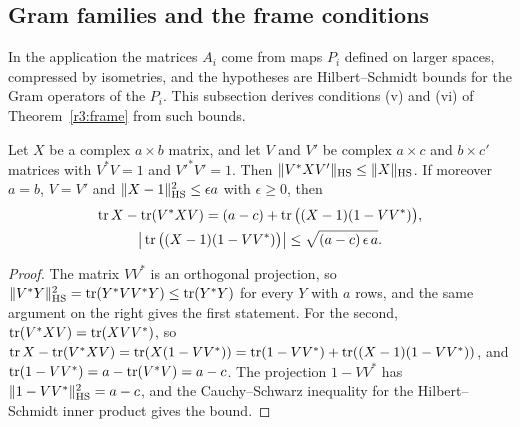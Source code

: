 \subsection{Gram families and the frame conditions}\label{r3:sec:gram}

In the application the matrices $A_i$ come from maps $P_i$ defined on larger spaces, compressed by isometries, and the hypotheses are Hilbert--Schmidt bounds for the Gram operators of the $P_i$. This subsection derives conditions (v) and (vi) of Theorem~\ref{r3:frame} from such bounds.

\begin{lemma}\label{r3:compress}
Let $X$ be a complex $a\times b$ matrix, and let $V$ and $V'$ be complex $a\times c$ and $b\times c'$ matrices with $V^*V=1$ and $V'^*V'=1$. Then $\lVert V^*XV'\rVert_{\mathrm{HS}}\le\lVert X\rVert_{\mathrm{HS}}$. If moreover $a=b$, $V=V'$ and $\lVert X-1\rVert_{\mathrm{HS}}^2\le\epsilon a$ with $\epsilon\ge0$, then
\begin{gather*}
\operatorname{tr} X-\operatorname{tr}(V^*XV)=(a-c)+\operatorname{tr}\big((X-1)(1-VV^*)\big),\\
\big\lvert\operatorname{tr}\big((X-1)(1-VV^*)\big)\big\rvert\le\sqrt{(a-c)\,\epsilon\,a}.
\end{gather*}
\end{lemma}

\begin{proof}
The matrix $VV^*$ is an orthogonal projection, so $\lVert V^*Y\rVert_{\mathrm{HS}}^2=\operatorname{tr}(Y^*VV^*Y)\le\operatorname{tr}(Y^*Y)$ for every $Y$ with $a$ rows, and the same argument on the right gives the first statement. For the second, $\operatorname{tr}(V^*XV)=\operatorname{tr}(XVV^*)$, so $\operatorname{tr} X-\operatorname{tr}(V^*XV)=\operatorname{tr}(X(1-VV^*))=\operatorname{tr}(1-VV^*)+\operatorname{tr}((X-1)(1-VV^*))$, and $\operatorname{tr}(1-VV^*)=a-\operatorname{tr}(V^*V)=a-c$. The projection $1-VV^*$ has $\lVert1-VV^*\rVert_{\mathrm{HS}}^2=a-c$, and the Cauchy--Schwarz inequality for the Hilbert--Schmidt inner product gives the bound.
\end{proof}

